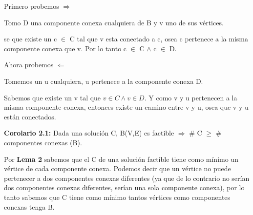 Primero probemos $\Rightarrow$

Tomo D una componente conexa cualquiera de B y v uno de sus vértices.

se que existe un c $\in$ C tal que v esta conectado a c, osea c pertenece a la misma componente conexa que v. Por lo tanto c $\in$ C $\wedge$ c $\in$ D.

Ahora probemos $\Leftarrow$

Tomemos un u cualquiera, u pertenece a la componente conexa D.

Sabemos que existe un v tal que $v \in C \wedge v \in D$. Y como v y u pertenecen a la misma componente conexa, entonces existe un camino entre v y u, osea que v y u están conectados.

\textbf{Corolario 2.1:} Dada una solución C, B(V,E) es factible $\Rightarrow$ \# C $\geq$ \# componentes conexas (B).

Por \textbf{Lema 2} sabemos que el C de una solución factible tiene como mínimo un vértice de cada componente conexa. Podemos decir que un vértice no puede pertenecer a dos componentes conexas diferentes (ya que de lo contrario no serían dos componentes conexas diferentes, serían una sola componente conexa), por lo tanto sabemos que C tiene como mínimo tantos vértices como componentes conexas tenga B.

%
%
%
%
%


